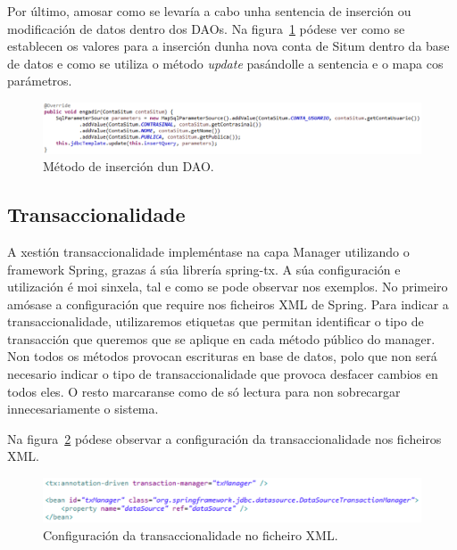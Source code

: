 Por último, amosar como se levaría a cabo unha sentencia de inserción ou modificación de datos dentro dos DAOs. Na figura~\ref{fig:daoInsert} pódese ver como se establecen os valores para a inserción dunha nova conta de Situm dentro da base de datos e como se utiliza o método \emph{update} pasándolle a sentencia e o mapa cos parámetros.

\begin{figure}[tbh] 
	\begin{center}
		\includegraphics[width=1\textwidth]{figures/codigo/daoInsert}
		\caption{Método de inserción dun DAO.}
		\label{fig:daoInsert}
	\end{center}
\end{figure}


\subsection{Transaccionalidade}
A xestión transaccionalidade impleméntase na capa Manager utilizando o framework Spring, grazas á súa librería spring-tx. A súa configuración e utilización é moi sinxela, tal e como se pode observar nos exemplos. No primeiro amósase a configuración que require nos ficheiros XML de Spring. Para indicar a transaccionalidade, utilizaremos etiquetas que permitan identificar o tipo de transacción que queremos que se aplique en cada método público do manager. Non todos os métodos provocan escrituras en base de datos, polo que non será necesario indicar o tipo de transaccionalidade que provoca desfacer cambios en todos eles. O resto marcaranse como de só lectura para non sobrecargar innecesariamente o sistema.

Na figura~\ref{fig:transaccionConfiguracion} pódese observar a configuración da transaccionalidade nos ficheiros XML.

\begin{figure}[tbh] 
	\begin{center}
		\includegraphics[width=1\textwidth]{figures/codigo/transaccionConfiguracion}
		\caption{Configuración da transaccionalidade no ficheiro XML.}
		\label{fig:transaccionConfiguracion}
	\end{center}
\end{figure}


